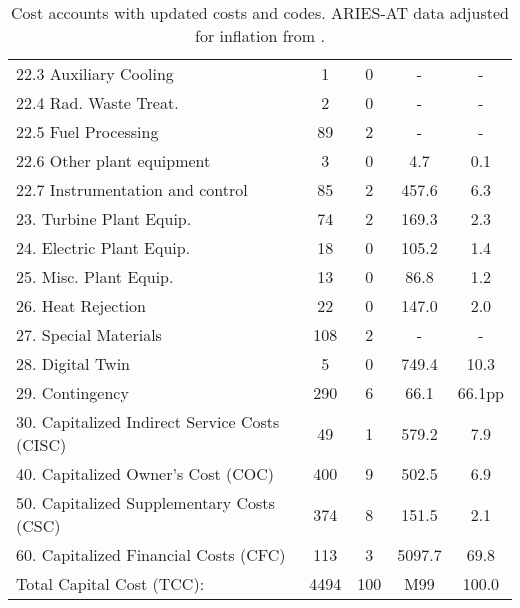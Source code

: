 \begin{table}[h!]
{\begin{tabular}{lcccc}
\hspace{10mm}22.3 Auxiliary Cooling & 1 & 0 & - & - \\
\hspace{10mm}22.4 Rad. Waste Treat. & 2 & 0 & - & - \\
\hspace{10mm}22.5 Fuel Processing & 89 & 2 & - & - \\
\hspace{10mm}22.6 Other plant equipment & 3 & 0 & 4.7 & 0.1 \\
\hspace{10mm}22.7 Instrumentation and control & 85 & 2 & 457.6 & 6.3 \\
\hspace{5mm}23. Turbine Plant Equip. & 74 & 2 & 169.3 & 2.3 \\
\hspace{5mm}24. Electric Plant Equip. & 18 & 0 & 105.2 & 1.4 \\
\hspace{5mm}25. Misc. Plant Equip. & 13 & 0 & 86.8 & 1.2 \\
\hspace{5mm}26. Heat Rejection & 22 & 0 & 147.0 & 2.0 \\
\hspace{5mm}27. Special Materials & 108 & 2 & - & - \\
\hspace{5mm}28. Digital Twin & 5 & 0 & 749.4 & 10.3 \\
\hspace{5mm}29. Contingency & 290 & 6 & 66.1 & 66.1pp \\
30. Capitalized Indirect Service Costs (CISC) & 49 & 1 & 579.2 & 7.9 \\
40. Capitalized Owner’s Cost (COC) & 400 & 9 & 502.5 & 6.9 \\
50. Capitalized Supplementary Costs (CSC) & 374 & 8 & 151.5 & 2.1 \\
60. Capitalized Financial Costs (CFC) & 113 & 3 & 5097.7 & 69.8 \\
\hline
Total Capital Cost (TCC): & 4494 & 100 & M99 & 100.0 \\
\hline
\end{tabular}
}
\caption{Cost accounts with updated costs and codes. ARIES-AT data adjusted for inflation from \cite{gordon1986mirror}.}
\label{tab:costs_updated_codes}
\end{table}


